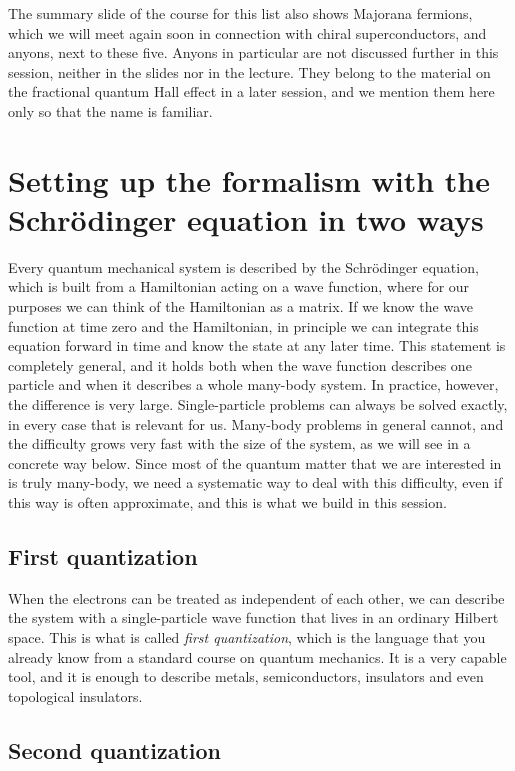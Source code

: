 The summary slide of the course for this list also shows Majorana fermions, which we will meet
again soon in connection with chiral superconductors, and anyons, next to these five. Anyons in
particular are not discussed further in this session, neither in the slides nor in the lecture.
They belong to the material on the fractional quantum Hall effect in a later session, and we
mention them here only so that the name is familiar.

\section{Setting up the formalism with the Schrödinger equation in two ways}

Every quantum mechanical system is described by the Schrödinger equation, which is built from a
Hamiltonian acting on a wave function, where for our purposes we can think of the Hamiltonian as a
matrix. If we know the wave function at time zero and the Hamiltonian, in principle we can
integrate this equation forward in time and know the state at any later time. This statement is
completely general, and it holds both when the wave function describes one particle and when it
describes a whole many-body system. In practice, however, the difference is very large. Single-particle problems can always be solved exactly, in every case that is relevant
for us. Many-body problems in general cannot, and the difficulty grows very fast with the size of
the system, as we will see in a concrete way below. Since most of the quantum matter that we are
interested in is truly many-body, we need a systematic way to deal with this difficulty, even if
this way is often approximate, and this is what we build in this session.

\subsection{First quantization}

When the electrons can be treated as independent of each other, we can describe the system with a
single-particle wave function that lives in an ordinary Hilbert space. This is what is called
\emph{first quantization}, which is the language that you already know from a standard course on
quantum mechanics. It is a very capable tool, and it is enough to describe metals, semiconductors,
insulators and even topological insulators.

\subsection{Second quantization}

